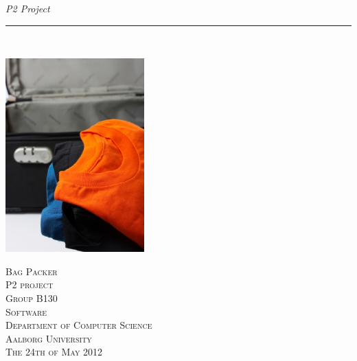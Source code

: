 \thispagestyle{empty}
\begin{flushright}
\vspace{3cm}

\phantom{hul}

\phantom{hul}

\phantom{hul}

\textsl{P2 Project} \\ \vspace{1cm}

\rule{13cm}{3mm} \\ \vspace{1.5cm}
\vspace{1cm}

\includegraphics[width=0.4\textwidth]{billeder/forside.jpg}

\vspace{2cm} 
\textsc{\Large Bag Packer \\
P2 project\\
Group B130\\
Software\\
Department of Computer Science\\
Aalborg University\\
The 24th of May 2012\\
}
\end{flushright}
